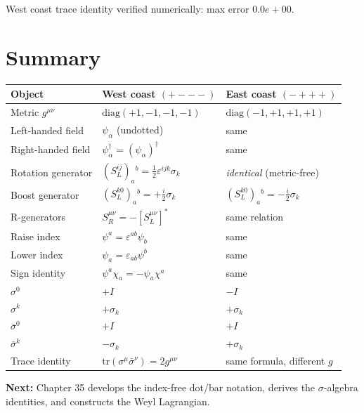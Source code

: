 \documentclass[12pt]{article}
\newcommand{\verified}[1]{\textcolor{verifygreen}{\checkmark\; #1}}
\newcommand{\psidag}{\psi^{\dagger}}
\begin{document}
\verified{West coast trace identity verified numerically: max error $0.0e+00$.}

\section{Summary}

\begin{center}
\renewcommand{\arraystretch}{1.4}
\begin{tabular}{@{}lll@{}}
  \toprule
  Object & West coast $(+{-}{-}{-})$ & East coast $(-{+}{+}{+})$ \\
  \midrule
  Metric $g^{\mu\nu}$ & $\mathrm{diag}(+1,-1,-1,-1)$ & $\mathrm{diag}(-1,+1,+1,+1)$ \\
  Left-handed field & $\psi_\alpha$ (undotted) & same \\
  Right-handed field & $\psidag_{\dot\alpha} = (\psi_\alpha)^\dagger$ & same \\
  Rotation generator & $(S^{ij}_L)_a{}^b = \tfrac{1}{2}\varepsilon^{ijk}\sigma_k$ & \emph{identical} (metric-free) \\
  Boost generator & $(S^{k0}_L)_a{}^b = +\tfrac{i}{2}\sigma_k$ & $(S^{k0}_L)_a{}^b = -\tfrac{i}{2}\sigma_k$ \\
  R-generators & $S^{\mu\nu}_R = -[S^{\mu\nu}_L]^*$ & same relation \\
  Raise index & $\psi^a = \varepsilon^{ab}\psi_b$ & same \\
  Lower index & $\psi_a = \varepsilon_{ab}\psi^b$ & same \\
  Sign identity & $\psi^a\chi_a = -\psi_a\chi^a$ & same \\
  $\sigma^0$ & $+I$ & $-I$ \\
  $\sigma^k$ & $+\sigma_k$ & $+\sigma_k$ \\
  $\bar\sigma^0$ & $+I$ & $+I$ \\
  $\bar\sigma^k$ & $-\sigma_k$ & $+\sigma_k$ \\
  Trace identity & $\mathrm{tr}(\sigma^\mu\bar\sigma^\nu)=2g^{\mu\nu}$ & same formula, different $g$ \\
  \bottomrule
\end{tabular}
\end{center}

\bigskip
\noindent\textbf{Next:} Chapter 35 develops the index-free dot/bar notation,
derives the $\sigma$-algebra identities, and constructs the Weyl Lagrangian.
\end{document}
